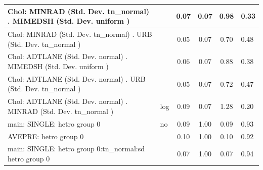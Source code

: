 \begin{table}
\begin{center}
\begin{tabular}{|l|l|c|c|c|l|}
			\hline
			 Chol: MINRAD (Std. Dev. tn_normal) . MIMEDSH (Std. Dev.   uniform ) &  & 0.07 & 0.07 & 0.98 & 0.33 \\
			\hline
			 Chol: MINRAD (Std. Dev. tn_normal) . URB (Std. Dev.   tn_normal ) &  & 0.05 & 0.07 & 0.70 & 0.48 \\
			\hline
			 Chol: ADTLANE (Std. Dev. normal) . MIMEDSH (Std. Dev.   uniform ) &  & 0.06 & 0.07 & 0.88 & 0.38 \\
			\hline
			 Chol: ADTLANE (Std. Dev. normal) . URB (Std. Dev.   tn_normal ) &  & 0.05 & 0.07 & 0.72 & 0.47 \\
			\hline
			 Chol: ADTLANE (Std. Dev. normal) . MINRAD (Std. Dev.   tn_normal ) & log & 0.09 & 0.07 & 1.28 & 0.20 \\
			\hline
			main: SINGLE: hetro group 0 & no & 0.09 & 1.00 & 0.09 & 0.93 \\
			\hline
			AVEPRE: hetro group 0 &  & 0.10 & 1.00 & 0.10 & 0.92 \\
			\hline
			main: SINGLE: hetro group 0:tn_normal:sd  hetro group 0 &  & 0.07 & 1.00 & 0.07 & 0.94 \\
			\hline
		\end{tabular}
	\end{center}
\end{table}